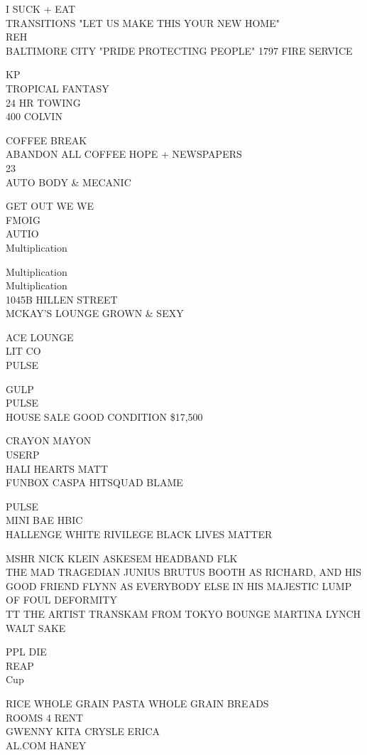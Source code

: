 \documentclass[10pt,letterpaper]{article}
\begin{document}
I SUCK + EAT\\
TRANSITIONS "LET US MAKE THIS YOUR NEW HOME"\\
REH\\
BALTIMORE CITY "PRIDE PROTECTING PEOPLE" 1797 FIRE SERVICE

KP\\
TROPICAL FANTASY\\
24 HR TOWING\\
400 COLVIN

COFFEE BREAK\\
ABANDON ALL COFFEE HOPE + NEWSPAPERS\\
23\\
AUTO BODY \& MECANIC

GET OUT WE WE\\
FMOIG\\
AUTIO\\
Multiplication

Multiplication\\
Multiplication\\
1045B HILLEN STREET\\
MCKAY'S LOUNGE GROWN \& SEXY

ACE LOUNGE\\
LIT CO\\
PULSE

GULP\\
PULSE\\
HOUSE SALE GOOD CONDITION \$17,500

CRAYON MAYON\\
USERP\\
HALI HEARTS MATT\\
FUNBOX CASPA HITSQUAD BLAME

PULSE\\
MINI BAE HBIC\\
HALLENGE WHITE RIVILEGE BLACK LIVES MATTER

MSHR NICK KLEIN ASKESEM HEADBAND FLK\\
THE MAD TRAGEDIAN JUNIUS BRUTUS BOOTH AS RICHARD, AND HIS GOOD FRIEND FLYNN AS EVERYBODY ELSE IN HIS MAJESTIC LUMP OF FOUL DEFORMITY\\
TT THE ARTIST TRANSKAM FROM TOKYO BOUNGE MARTINA LYNCH\\
WALT SAKE

PPL DIE\\
REAP\\
Cup

RICE WHOLE GRAIN PASTA WHOLE GRAIN BREADS\\
ROOMS 4 RENT\\
GWENNY KITA CRYSLE ERICA\\
AL.COM HANEY
\end{document}

